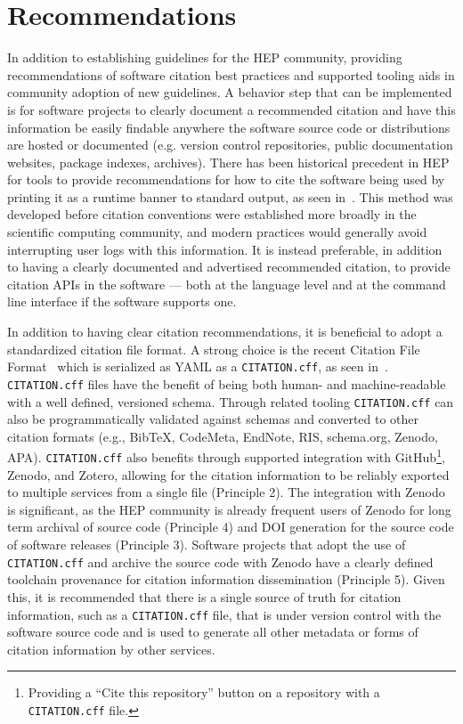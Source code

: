 \section{Recommendations}\label{sec:recommendations}

In addition to establishing guidelines for the HEP community, providing recommendations of software citation best practices and supported tooling aids in community adoption of new guidelines.
A behavior step that can be implemented is for software projects to clearly document a recommended citation and have this information be easily findable anywhere the software source code or distributions are hosted or documented (e.g. version control repositories, public documentation websites, package indexes, archives).
There has been historical precedent in HEP for tools to provide recommendations for how to cite the software being used by printing it as a runtime banner to standard output, as seen in~.
This method was developed before citation conventions were established more broadly in the scientific computing community, and modern practices would generally avoid interrupting user logs with this information.
It is instead preferable, in addition to having a clearly documented and advertised recommended citation, to provide citation APIs in the software --- both at the language level and at the command line interface if the software supports one.

In addition to having clear citation recommendations, it is beneficial to adopt a standardized citation file format.
A strong choice is the recent Citation File Format~\cite{Druskat_Citation_File_Format_2021} which is serialized as YAML as a \texttt{CITATION.cff}, as seen in~.
\texttt{CITATION.cff} files have the benefit of being both human- and machine-readable with a well defined, versioned schema.
Through related tooling \texttt{CITATION.cff} can also be programmatically validated against schemas and converted to other citation formats (e.g., BibTeX, CodeMeta, EndNote, RIS, schema.org, Zenodo, APA).
\texttt{CITATION.cff} also benefits through supported integration with GitHub\footnote{Providing a ``Cite this repository'' button on a repository with a \texttt{CITATION.cff} file.}, Zenodo, and Zotero, allowing for the citation information to be reliably exported to multiple services from a single file (Principle 2).
The integration with Zenodo is significant, as the HEP community is already frequent users of Zenodo for long term archival of source code (Principle 4) and DOI generation for the source code of software releases (Principle 3).
Software projects that adopt the use of \texttt{CITATION.cff} and archive the source code with Zenodo have a clearly defined toolchain provenance for citation information dissemination (Principle 5).
Given this, it is recommended that there is a single source of truth for citation information, such as a \texttt{CITATION.cff} file, that is under version control with the software source code and is used to generate all other metadata or forms of citation information by other services.


